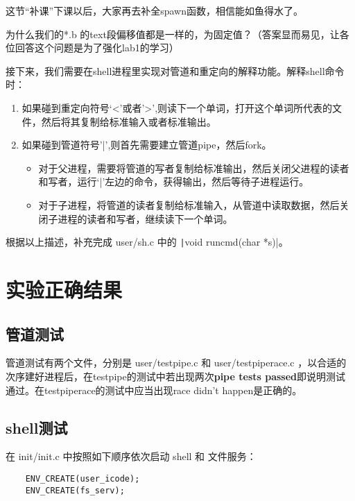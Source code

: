 这节“补课”下课以后，大家再去补全spawn函数，相信能如鱼得水了。

\begin{thinking}
 为什么我们的*.b 的text段偏移值都是一样的，为固定值？（答案显而易见，让各位回答这个问题是为了强化lab1的学习）
\end{thinking}

接下来，我们需要在shell进程里实现对管道和重定向的解释功能。解释shell命令时：

\begin{enumerate}
	\item 如果碰到重定向符号‘<’或者’>’,则读下一个单词，打开这个单词所代表的文件，然后将其复制给标准输入或者标准输出。
	\item 如果碰到管道符号’|’,则首先需要建立管道pipe，然后fork。
	\begin{itemize}
		\item 对于父进程，需要将管道的写者复制给标准输出，然后关闭父进程的读者和写者，运行‘|’左边的命令，获得输出，然后等待子进程运行。
		\item 对于子进程，将管道的读者复制给标准输入，从管道中读取数据，然后关闭子进程的读者和写者，继续读下一个单词。
	\end{itemize}
\end{enumerate}

\begin{exercise}
	根据以上描述，补充完成 user/sh.c 中的 \texttt|void runcmd(char *s)|。
\end{exercise}

\section{实验正确结果}

\subsection{管道测试}
管道测试有两个文件，分别是 user/testpipe.c 和 user/testpiperace.c ，以合适的次序建好进程后，在testpipe的测试中若出现两次\textbf{pipe tests passed}即说明测试通过。在testpiperace的测试中应当出现{race didn't happen}是正确的。

\subsection{shell测试}
在 init/init.c 中按照如下顺序依次启动 shell 和 文件服务：

\begin{verbatim}
	ENV_CREATE(user_icode);
	ENV_CREATE(fs_serv);
\end{verbatim}

